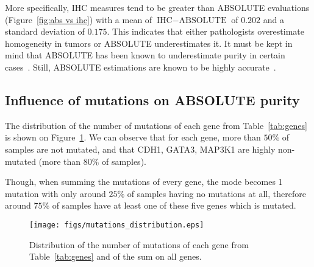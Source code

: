 \documentclass[letterpaper]{article}
\begin{document}
More specifically, IHC measures tend to be greater than ABSOLUTE evaluations (Figure~\ref{fig:abs vs ihc}) with a mean of $\text{IHC} - \text{ABSOLUTE}$ of $0.202$
and a standard deviation of $0.175$. This indicates that either pathologists overestimate homogeneity in tumors or ABSOLUTE underestimates it. It must be kept in
mind that ABSOLUTE has been known to underestimate purity in certain cases~\citep{oesper2014quantifying}. Still, ABSOLUTE estimations are known to be highly
accurate~\citep{carter2012absolute}.

\subsection{Influence of mutations on ABSOLUTE purity}
The distribution of the number of mutations of each gene from Table~\ref{tab:genes} is shown on Figure~\ref{fig:mutations distribution}. We can observe that for each
gene, more than $50\%$ of samples are not mutated, and that CDH1, GATA3, MAP3K1 are highly non-mutated (more than $80\%$ of samples).

Though, when summing the mutations of every gene, the mode becomes 1 mutation with only around $25\%$ of samples having no mutations at all, therefore around $75\%$
of samples have at least one of these five genes which is mutated.

\begin{figure}[!h]
\hspace{-.5cm}
\texttt{[image: figs/mutations\_distribution.eps]}
\vspace{-1cm}
\caption{Distribution of the number of mutations of each gene from Table~\ref{tab:genes} and of the sum on all genes.\label{fig:mutations distribution}}
\end{figure}
\end{document}
